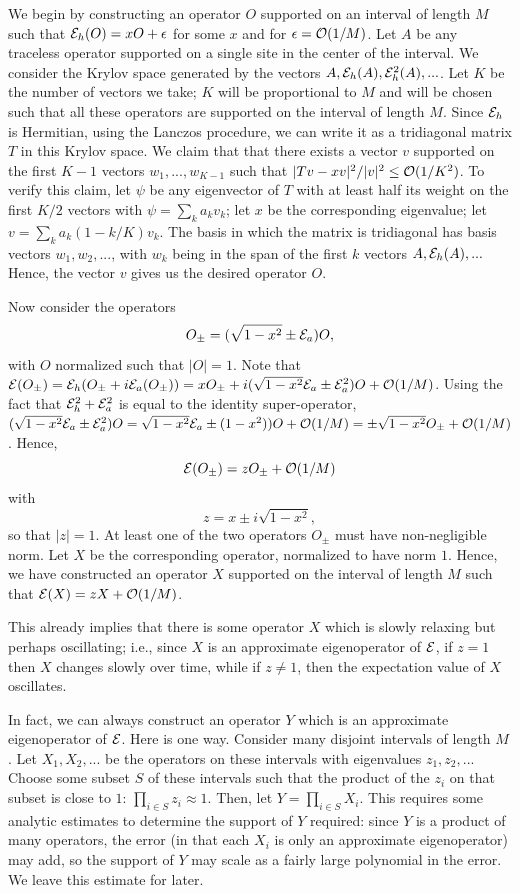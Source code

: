 \documentclass[twocolumn,superscriptaddress, prb]{revtex4-1}
\newcommand{\be}{\begin{equation}}
\newcommand{\ee}{\end{equation}}
\begin{document}
We begin by constructing an operator $O$ supported on an interval of length $M$ such that ${\cal E}_h(O)= x O+\epsilon$ for some $x$ and for $\epsilon={\cal O}(1/M)$.  Let $A$ be any traceless operator supported on a single site in the center of the interval.  We consider the Krylov space generated by the vectors $A, {\cal E}_h(A), {\cal E}_h^2(A),...$.  Let $K$ be the number of vectors we take; $K$ will be proportional to $M$ and will be chosen such that all these operators are supported on the interval of length $M$.
Since ${\cal E}_h$ is Hermitian, using the Lanczos procedure, we can write it as a tridiagonal matrix $T$ in this Krylov space.   We claim that that there exists a vector $v$ supported on the first $K-1$ vectors $w_1,...,w_{K-1}$ such that $|Tv-xv|^2/|v|^2\leq {\cal O}(1/K^2)$.  To verify this claim, let $\psi$ be any eigenvector of $T$ with at least half its weight on the first $K/2$ vectors with $\psi=\sum_k a_k v_k$; let $x$ be the corresponding eigenvalue; let $v=\sum_k a_k (1-k/K) v_k$.
The basis in which the matrix is tridiagonal has basis vectors $w_1,w_2,...$, with $w_k$ being in the span of the first $k$ vectors $A, {\cal E}_h(A),...$
Hence, the vector $v$ gives us the desired operator $O$.

Now consider the operators
\be
O_{\pm}=(\sqrt{1-x^2} \pm {\cal E}_a) O,
\ee
with $O$ normalized such that $|O|=1$.
Note that ${\cal E}(O_{\pm})={\cal E}_h(O_{\pm}+i {\cal E}_a(O_{\pm}))=xO_{\pm}+i(\sqrt{1-x^2}{\cal E}_a \pm {\cal E}_a^2) O + {\cal O}(1/M)$.  Using 
the fact that ${\cal E}_h^2+{\cal E}_a^2$ is equal to the identity super-operator, $(\sqrt{1-x^2}{\cal E}_a \pm {\cal E}_a^2) O=\sqrt{1-x^2}{\cal E}_a \pm (1-x^2) ) O +{\cal O}(1/M)=\pm\sqrt{1-x^2}O_{\pm}+{\cal O}(1/M)$. 
Hence,
\be
{\cal E}(O_{\pm})=z O_{\pm}+{\cal O}(1/M)
\ee
with
\be
z=x\pm i \sqrt{1-x^2},
\ee
so that $|z|=1$.
At least one of the two operators $O_{\pm}$ must have non-negligible norm.  Let $X$ be the corresponding operator, normalized to have norm $1$.  Hence, we have constructed an operator $X$ supported on the interval of length $M$ such that ${\cal E}(X)=z X + {\cal O}(1/M)$.

This already implies that there is some operator $X$ which is slowly relaxing but perhaps oscillating; i.e., since $X$ is an approximate eigenoperator of ${\cal E}$, if $z=1$ then $X$ changes slowly over time, while if $z \neq 1$, then the expectation value of $X$ oscillates.

In fact, we can always construct an operator $Y$ which is an approximate eigenoperator of ${\cal E}$.  Here is one way.  Consider many disjoint intervals of length $M$.  Let $X_1,X_2,...$ be the operators on these intervals with eigenvalues $z_1,z_2,...$  Choose some subset $S$ of these intervals such that the product of the $z_i$ on that subset is close to $1$: $\prod_{i \in S} z_i \approx 1$.  Then, let $Y=\prod_{i \in S} X_i$.  This requires some analytic estimates to determine the support of $Y$ required: since $Y$ is a product of many operators, the error (in that each $X_i$ is only an approximate eigenoperator) may add, so the support of $Y$ may scale as a fairly large polynomial in the error.  We leave this estimate for later.
\end{document}
